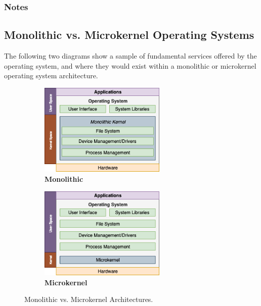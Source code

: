     \subsubsection*{Notes}

    \vfill


    \pagebreak

    \subsection*{Monolithic vs. Microkernel Operating Systems}

    The following two diagrams show a sample of fundamental services offered by the operating system, and where they would exist within a monolithic or microkernel operating system architecture.

    \medskip
    \begin{figure}[h]
        \centering
        \begin{subfigure}{0.45\boxwidth}
            \centering
            \caption*{\bfseries Monolithic}
            \includegraphics[width=6cm]{Extras/operating_system_monolithic}
        \end{subfigure}
        \begin{subfigure}{0.45\boxwidth}
            \centering
            \caption*{\bfseries Microkernel}
            \includegraphics[width=6cm]{Extras/operating_system_microkernel}
        \end{subfigure}
        \caption{Monolithic vs. Microkernel Architectures.}
    \end{figure}
    

